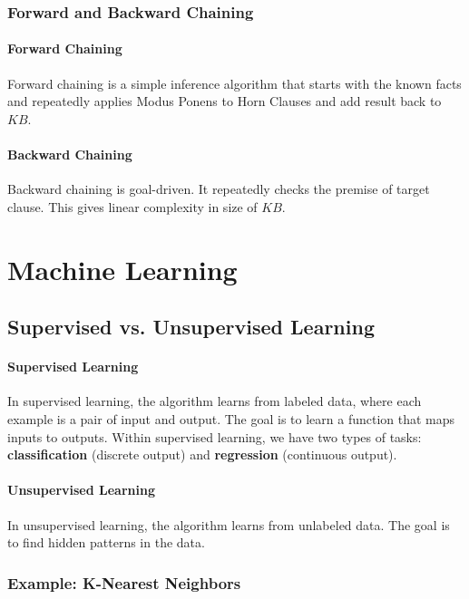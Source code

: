 \documentclass[a4paper,12pt]{article}
\begin{document}
\subsubsection{Forward and Backward Chaining}

\paragraph{Forward Chaining} Forward chaining is a simple inference algorithm that starts with the known facts and repeatedly applies Modus Ponens to Horn Clauses and add result back to $KB$.

\paragraph{Backward Chaining} Backward chaining is goal-driven. It repeatedly checks the premise of target clause. This gives linear complexity in size of $KB$.

\section{Machine Learning}

\subsection{Supervised vs. Unsupervised Learning}

\paragraph{Supervised Learning} In supervised learning, the algorithm learns from labeled data, where each example is a pair of input and output. The goal is to learn a function that maps inputs to outputs. Within supervised learning, we have two types of tasks: \textbf{classification} (discrete output) and \textbf{regression} (continuous output).

\paragraph{Unsupervised Learning} In unsupervised learning, the algorithm learns from unlabeled data. The goal is to find hidden patterns in the data.

\subsubsection{Example: K-Nearest Neighbors}
\end{document}
